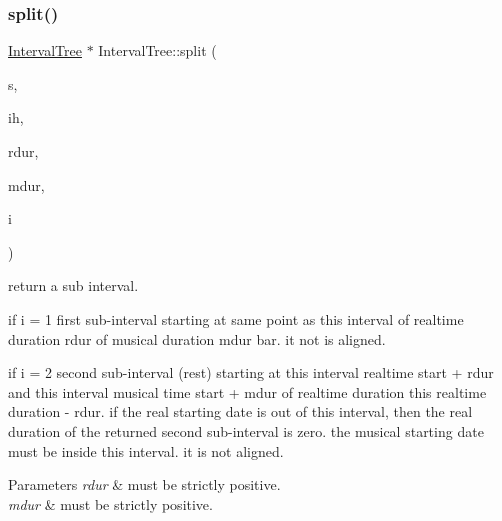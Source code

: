 \subsubsection{\texorpdfstring{split()}{split()}}
{\footnotesize\ttfamily \mbox{\hyperlink{classIntervalTree}{Interval\+Tree}} $\ast$ Interval\+Tree\+::split (\begin{DoxyParamCaption}\item[{const \mbox{\hyperlink{classInputSegment}{Input\+Segment}} $\ast$}]{s,  }\item[{\mbox{\hyperlink{classIntervalHeap}{Interval\+Heap}} $\ast$}]{ih,  }\item[{double}]{rdur,  }\item[{\mbox{\hyperlink{classRational}{Rational}}}]{mdur,  }\item[{size\+\_\+t}]{i }\end{DoxyParamCaption})}



return a sub interval. 


\begin{DoxyItemize}
\item if i = 1 first sub-\/interval starting at same point as this interval of realtime duration rdur of musical duration mdur bar. it not is aligned.
\item if i = 2 second sub-\/interval (rest) starting at this interval realtime start + rdur and this interval musical time start + mdur of realtime duration this realtime duration -\/ rdur. if the real starting date is out of this interval, then the real duration of the returned second sub-\/interval is zero. the musical starting date must be inside this interval. it is not aligned.
\end{DoxyItemize}


\begin{DoxyParams}{Parameters}
{\em rdur} & must be strictly positive. \\
\hline
{\em mdur} & must be strictly positive. \\
\hline
\end{DoxyParams}
\mbox{\label{group__segment_ga5b1393db865d0dd81249033dd99ecd5c}} 
